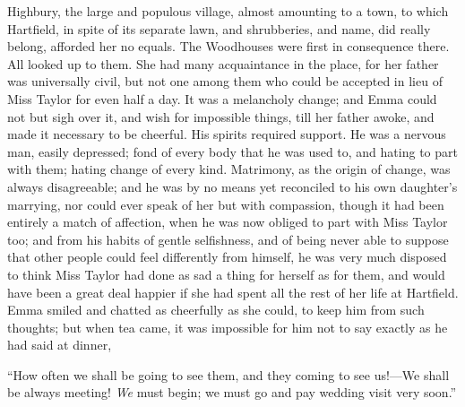 Highbury, the large and populous village, almost amounting to a town, to which Hartfield, in spite of its separate lawn, and shrubberies, and name, did really belong, afforded her no equals. The Woodhouses were first in consequence there. All looked up to them. She had many acquaintance in the place, for her father was universally civil, but not one among them who could be accepted in lieu of Miss Taylor for even half a day. It was a melancholy change; and Emma could not but sigh over it, and wish for impossible things, till her father awoke, and made it necessary to be cheerful. His spirits required support. He was a nervous man, easily depressed; fond of every body that he was used to, and hating to part with them; hating change of every kind. Matrimony, as the origin of change, was always disagreeable; and he was by no means yet reconciled to his own daughter's marrying, nor could ever speak of her but with compassion, though it had been entirely a match of affection, when he was now obliged to part with Miss Taylor too; and from his habits of gentle selfishness, and of being never able to suppose that other people could feel differently from himself, he was very much disposed to think Miss Taylor had done as sad a thing for herself as for them, and would have been a great deal happier if she had spent all the rest of her life at Hartfield. Emma smiled and chatted as cheerfully as she could, to keep him from such thoughts; but when tea came, it was impossible for him not to say exactly as he had said at dinner,




“How often we shall be going to see them, and they coming to see us!---We shall be always meeting! {\em We} must begin; we must go and pay wedding visit very soon.”


